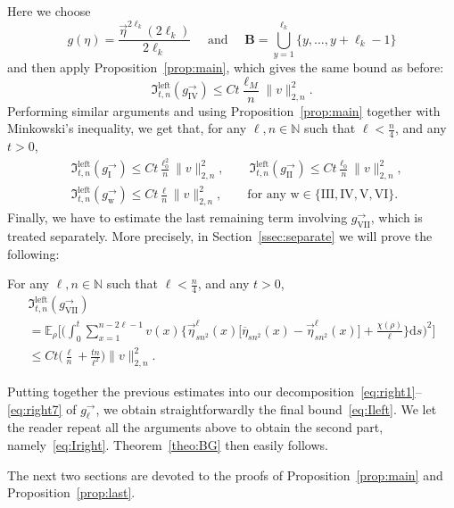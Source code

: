 \documentclass[AHL,Unicode,longabstracts]{cedram}
\newcommand{\bfB}{\mathbf{B}}
\newcommand*{\rmw}{\mathrm{w}}
\newcommand*{\rmleft}{\mathrm{left}}
\newcommand*{\rmI}{\mathrm{I}}
\newcommand*{\rmII}{\mathrm{II}}
\newcommand*{\rmIII}{\mathrm{III}}
\newcommand*{\rmIV}{\mathrm{IV}}
\newcommand*{\rmV}{\mathrm{V}}
\newcommand*{\rmVI}{\mathrm{VI}}
\newcommand*{\rmVII}{\mathrm{VII}}
\newcommand{\bb}[1]{{\mathbb #1}}
\newcommand{\mf}[1]{{\mathfrak #1}}
\renewcommand\vec[1]{\overrightarrow{#1}}
\renewcommand{\bar}{\overline}
\renewcommand{\leq}{\leqslant}
\newcommand*{\dd}{\mathrm{d}}
\newcommand*{\ds}{\dd s}
\begin{document}
Here we choose
\[
g(\eta) = \frac{\vec\eta^{2\ell_k}(2\ell_k)}{2\ell_k} \quad \text{ and } \quad {\bfB} = \bigcup_{y=1}^{\ell_k} \big\{ y, \dots, y+\ell_k-1\big\}
\]
and then apply Proposition~\ref{prop:main}, which gives the same bound as before:
\[
\mf I_{t,n}^{\rmleft}(g^\rightarrow_{\rmIV}) \leq Ct \frac{\ell_{M}}{n}\|v\|_{2,n}^2.
\]
Performing similar arguments and using Proposition~\ref{prop:main} together with Minkowski's inequality, we get that, for any $\ell,n\in\bb N$ such that $\ell <\frac n 4$, and any $t>0$,
\begin{align*}
&\mf I_{t,n}^{\rmleft}(g^\rightarrow_{\rmI}) \leq Ct \frac{\ell_0^2}{n}\|v\|_{2,n}^2, \quad \quad
\mf I_{t,n}^{\rmleft}(g^\rightarrow_{\rmII}) \leq Ct \frac{\ell_0}{n}\|v\|_{2,n}^2, \\
&\mf I_{t,n}^{\rmleft}(g^\rightarrow_{\rmw}) \leq Ct \frac{\ell}{n}\|v\|_{2,n}^2, \qquad \text{for any } {\rmw} \in \{\rmIII, \rmIV, \rmV, \rmVI\}.
\end{align*}
Finally, we have to estimate the last remaining term involving $g_{\rmVII}^\rightarrow$, which is treated separately. More precisely, in Section~\ref{ssec:separate} we will prove the following:

\begin{prop}\label{prop:last}
For any $\ell,n\in\bb N$ such that $\ell <\frac n 4$, and any $t>0$,
\begin{multline}\label{eq:right7bis}
\mf I_{t,n}^{\rmleft}(g^\rightarrow_{\rmVII})\\
=\bb E_\rho\bigg[\bigg(\int_0^t \sum_{x=1}^{n-2\ell-1} v(x)\Big\{\vec\eta_{sn^2}^\ell(x) \Big[\bar\eta_{sn^2}(x)-\vec\eta_{sn^2}^\ell(x)\Big] + \frac{\chi(\rho)}{\ell}\Big\} \ds\bigg)^2\bigg]
\\ \leq Ct \bigg(\frac{\ell}{n}+\frac{tn}{\ell^2}\bigg)\|v\|_{2,n}^2.
\end{multline}
\end{prop}

Putting together the previous estimates into our decomposition~\eqref{eq:right1}--\eqref{eq:right7} of $g_\ell^\rightarrow$, we obtain straightforwardly the final bound~\eqref{eq:Ileft}. We let the reader repeat all the arguments above to obtain the second part, namely~\eqref{eq:Iright}. Theorem~\ref{theo:BG} then easily follows.

The next two sections are devoted to the proofs of Proposition~\ref{prop:main} and Proposition~\ref{prop:last}.
\end{document}
